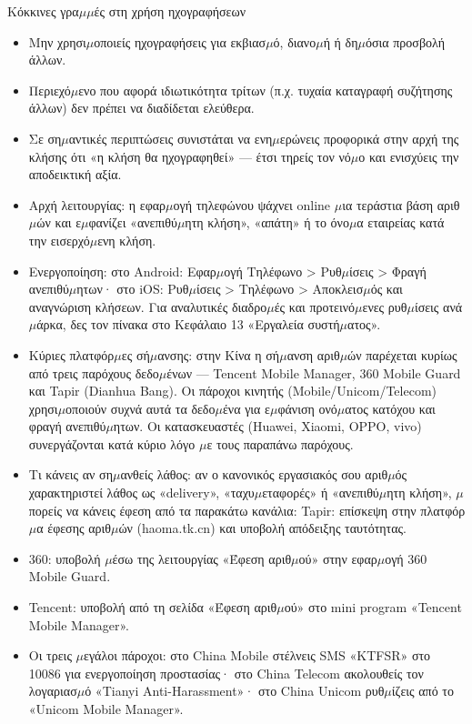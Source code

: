 \begin{tcbwarn}{Κόκκινες γρα$\mu$$\mu$ές στη χρήση ηχογραφήσεων}
\begin{itemize}
  \item Μην χρησι$\mu$οποιείς ηχογραφήσεις για εκβιασ$\mu$ό, διανο$\mu$ή ή δη$\mu$όσια προσβολή άλλων.
  \item Περιεχό$\mu$ενο που αφορά ιδιωτικότητα τρίτων (π.χ. τυχαία καταγραφή συζήτησης άλλων) δεν πρέπει να διαδίδεται ελεύθερα.
  \item Σε ση$\mu$αντικές περιπτώσεις συνιστάται να ενη$\mu$ερώνεις προφορικά στην αρχή της κλήσης ότι «η κλήση θα ηχογραφηθεί» — έτσι τηρείς τον νό$\mu$ο και ενισχύεις την αποδεικτική αξία.
\end{itemize}

\end{tcbwarn}


\begin{itemize}
  \item Αρχή λειτουργίας: η εφαρ$\mu$ογή τηλεφώνου ψάχνει online $\mu$ια τεράστια βάση αριθ$\mu$ών και ε$\mu$φανίζει «ανεπιθύ$\mu$ητη κλήση», «απάτη» ή το όνο$\mu$α εταιρείας κατά την εισερχό$\mu$ενη κλήση.
  \item Ενεργοποίηση: στο Android: Εφαρ$\mu$ογή Τηλέφωνο > Ρυθ$\mu$ίσεις > Φραγή ανεπιθύ$\mu$ητων· στο iOS: Ρυθ$\mu$ίσεις > Τηλέφωνο > Αποκλεισ$\mu$ός και αναγνώριση κλήσεων. Για αναλυτικές διαδρο$\mu$ές και προτεινό$\mu$ενες ρυθ$\mu$ίσεις ανά $\mu$άρκα, δες τον πίνακα στο Κεφάλαιο 13 «Εργαλεία συστή$\mu$ατος».
  \item Κύριες πλατφόρ$\mu$ες σή$\mu$ανσης: στην Κίνα η σή$\mu$ανση αριθ$\mu$ών παρέχεται κυρίως από τρεις παρόχους δεδο$\mu$ένων — Tencent Mobile Manager, 360 Mobile Guard και Tapir (Dianhua Bang). Οι πάροχοι κινητής (Mobile/Unicom/Telecom) χρησι$\mu$οποιούν συχνά αυτά τα δεδο$\mu$ένα για ε$\mu$φάνιση ονό$\mu$ατος κατόχου και φραγή ανεπιθύ$\mu$ητων. Οι κατασκευαστές (Huawei, Xiaomi, OPPO, vivo) συνεργάζονται κατά κύριο λόγο $\mu$ε τους παραπάνω παρόχους.
  \item Τι κάνεις αν ση$\mu$ανθείς λάθος: αν ο κανονικός εργασιακός σου αριθ$\mu$ός χαρακτηριστεί λάθος ως «delivery», «ταχυ$\mu$εταφορές» ή «ανεπιθύ$\mu$ητη κλήση», $\mu$πορείς να κάνεις έφεση από τα παρακάτω κανάλια: Tapir: επίσκεψη στην πλατφόρ$\mu$α έφεσης αριθ$\mu$ών (haoma.tk.cn) και υποβολή απόδειξης ταυτότητας.
  \item 360: υποβολή $\mu$έσω της λειτουργίας «Έφεση αριθ$\mu$ού» στην εφαρ$\mu$ογή 360 Mobile Guard.
  \item Tencent: υποβολή από τη σελίδα «Έφεση αριθ$\mu$ού» στο mini program «Tencent Mobile Manager».
  \item Οι τρεις $\mu$εγάλοι πάροχοι: στο China Mobile στέλνεις SMS «KTFSR» στο 10086 για ενεργοποίηση προστασίας· στο China Telecom ακολουθείς τον λογαριασ$\mu$ό «Tianyi Anti-Harassment»· στο China Unicom ρυθ$\mu$ίζεις από το «Unicom Mobile Manager».
\end{itemize}

